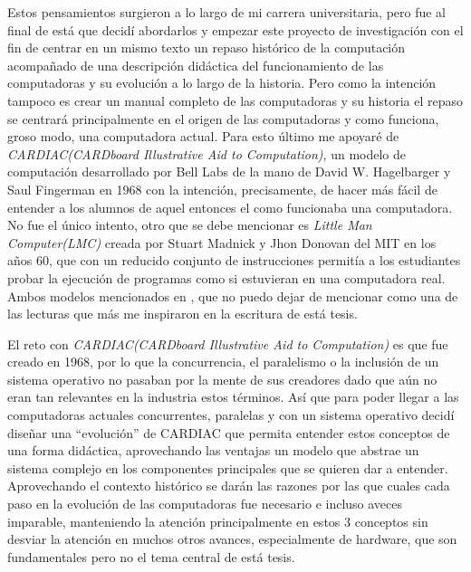 \documentclass[letterpaper,12pt,oneside]{book}
\begin{document}
	Estos pensamientos surgieron a lo largo de mi carrera universitaria, pero fue al final de está que decidí abordarlos y empezar este proyecto de investigación
	con el fin de centrar en un mismo texto un repaso histórico de la computación acompañado de una descripción didáctica del funcionamiento de las computadoras
	y su evolución a lo largo de la historia. Pero como la intención tampoco es crear un manual completo de las computadoras y su historia el repaso
	se centrará principalmente en el origen de las computadoras y como funciona, groso modo, una computadora actual. Para esto último me apoyaré
	de \textit{CARDIAC(CARDboard Illustrative Aid to Computation)}, un modelo de computación 
	desarrollado por Bell Labs de la mano de David W. Hagelbarger y Saul Fingerman en 1968\cite{hegelbarger_instruction_1968} con la intención, precisamente,
	de hacer más fácil de entender a los alumnos de aquel entonces el como funcionaba una computadora. No fue el único intento, otro que se debe mencionar es
	\textit{Little Man Computer(LMC)} creada por Stuart Madnick y Jhon Donovan del MIT en los años 60, que con un reducido conjunto de instrucciones permitía a los estudiantes 
	probar la ejecución de programas como si estuvieran en una computadora real. Ambos modelos mencionados en \cite{mark_jones_lorenzo_paper_2017}, que
	no puedo dejar de mencionar como una de las lecturas que más me inspiraron en la escritura de está tesis.
	
	El reto con \textit{CARDIAC(CARDboard Illustrative Aid to Computation)} es que fue creado en 1968, por lo que la concurrencia, el paralelismo o
	la inclusión de un sistema operativo no pasaban por la mente de sus creadores dado que aún no eran tan relevantes en la industria estos términos. Así que
	para poder llegar a las computadoras actuales concurrentes, paralelas y con un sistema operativo decidí diseñar una ``evolución'' de CARDIAC que permita
	entender estos conceptos de una forma didáctica, aprovechando las ventajas un modelo que abstrae un sistema complejo en los componentes principales
	que se quieren dar a entender. Aprovechando el contexto histórico se darán las razones por las que cuales cada paso en la evolución de las
	computadoras fue necesario e incluso aveces imparable, manteniendo la atención principalmente en estos 3 conceptos sin desviar la atención en
	muchos otros avances, especialmente de hardware, que son fundamentales pero no el tema central de está tesis.
	 
\end{document}
